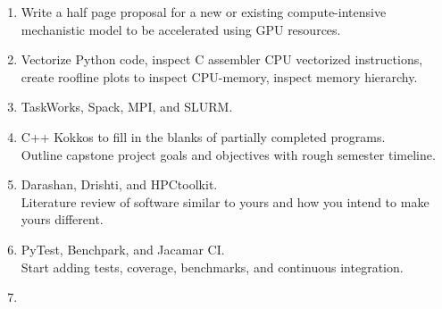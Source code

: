 \documentclass{article}
\begin{document}
\begin{tcbposter}
{\begin{center}
    \end{center}
    \vspace{-2\baselineskip}
    \begin{multicols}{2}
      \begin{enumerate}
      \item \textcolor{red!80!black}{\faWrench{}}
        Write a half page proposal for a new or
        existing compute-intensive mechanistic model to be accelerated
        using GPU resources.%
      \item \textcolor{orange!90!black}{\faSuitcase{}}
        Vectorize Python code,
        inspect C assembler CPU vectorized instructions, create
        roofline plots to inspect CPU-memory, inspect memory
        hierarchy.%
      \item \textcolor{orange!90!black}{\faSuitcase{}}
        TaskWorks, Spack, MPI, and SLURM.%
      \item \textcolor{orange!90!black}{\faSuitcase{}}
        C++ Kokkos to fill in
        the blanks of partially completed programs.\\
        \textcolor{orange!90!black}{\faWrench{}}
        Outline capstone project goals and objectives
        with rough semester timeline.%
      \item \textcolor{orange!90!black}{\faSuitcase{}}
        Darashan, Drishti, and
        HPCtoolkit.\\
        \textcolor{orange!90!black}{\faWrench{}}
        Literature review of software
        similar to yours and how you intend to make yours different.%
      \item \textcolor{blue!80!black}{\faKeyboardO{}}
        PyTest, Benchpark, and
        Jacamar CI.\@\\
        \textcolor{blue!80!black}{\faWrench{}}
        Start adding tests, coverage, benchmarks,
        and continuous integration.%
      \item \textcolor{blue!80!black}{\faKeyboardO{}}

\end{enumerate}
\end{multicols}}
\end{tcbposter}
\end{document}
